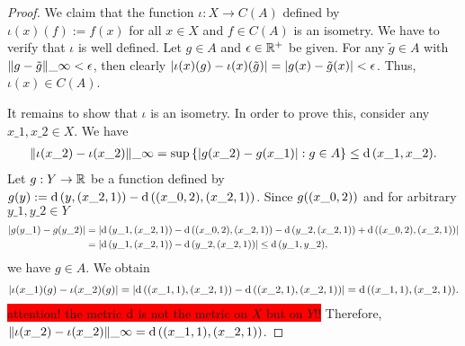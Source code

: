 \begin{proof}
	We claim that the function $\iota: X \to C(A)$ defined by $\iota(x)(f) := f(x)$ for all $x \in X$ and $f \in C(A)$ is an isometry. We have to verify that $\iota$ is well defined. Let $g \in A$ and $\epsilon \in \R^+$ be given. For any $\tilde{g} \in A$ with $\norm[\infty]{g - \tilde{g}} < \epsilon$, then clearly $\vbraces{\iota(x)(g) - \iota(x)\pbraces{\tilde{g}}} = \vbraces{g(x) - \tilde{g}(x)} < \epsilon$. Thus, $\iota(x) \in C(A)$.  
	
	It remains to show that $\iota$ is an isometry. In order to prove this, consider any $x\_1, x\_2 \in X$. We have 
	\begin{align*}
		\norm[\infty]{\iota\pbraces{x\_2} - \iota\pbraces{x\_2}} = \sup \Bbraces{\vbraces{g\pbraces{x\_2} - g\pbraces{x\_1}} : g \in A} \leq \metric\pbraces{x\_1, x\_2}.
	\end{align*} 
	Let $g: Y \to \R$ be a function defined by $g(y) := \metric\pbraces{y, \pbraces{x\_2, 1}} - \metric\pbraces{\pbraces{x\_0, 2}, \pbraces{x\_2, 1}}$. Since $g\pbraces{\pbraces{x\_0, 2}}$ and  for arbitrary $y\_1, y\_2 \in Y$
	\begin{align*}
		\vbraces{g\pbraces{y\_1} - g\pbraces{y\_2}} &= \vbraces{\metric\pbraces{y\_1, \pbraces{x\_2, 1}} - \metric\pbraces{\pbraces{x\_0, 2}, \pbraces{x\_2, 1}} - \metric\pbraces{y\_2, \pbraces{x\_2, 1}} + \metric\pbraces{\pbraces{x\_0, 2}, \pbraces{x\_2, 1}}} \\
		&= \vbraces{\metric\pbraces{y\_1, \pbraces{x\_2, 1}} - \metric\pbraces{y\_2, \pbraces{x\_2, 1}}} \leq \metric\pbraces{y\_1, y\_2},
	\end{align*}
	we have $g \in A$. We obtain
	\begin{align*}
		\vbraces{\iota(x\_1)(g) - \iota(x\_2)(g)} = \vbraces{\metric\pbraces{\pbraces{x\_1, 1}, \pbraces{x\_2, 1}} - \metric\pbraces{\pbraces{x\_2, 1}, \pbraces{x\_2, 1}}} = \metric\pbraces{\pbraces{x\_1, 1}, \pbraces{x\_2, 1}}.
	\end{align*}
	\colorbox{red}{attention! the metric $\metric$ is not the metric on $X$ but on $Y$!!} Therefore, $\norm[\infty]{\iota\pbraces{x\_2} - \iota\pbraces{x\_2}} = \metric\pbraces{\pbraces{x\_1, 1}, \pbraces{x\_2, 1}}$.
	

\end{proof}
